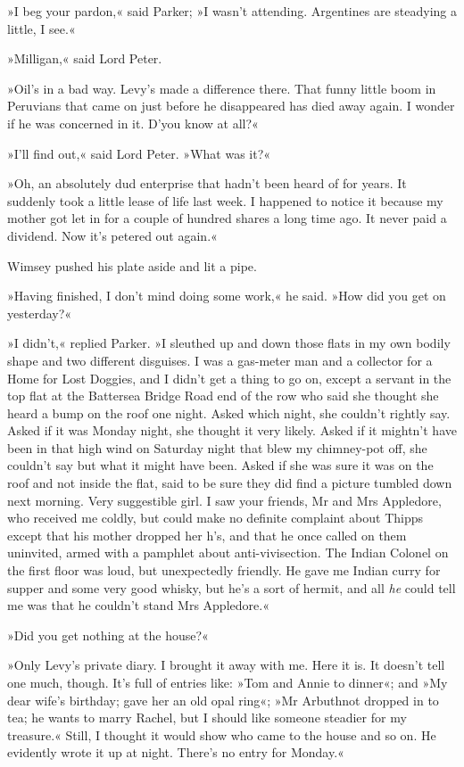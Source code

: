 »I beg your pardon,« said Parker; »I wasn't attending. Argentines are steadying a little, I see.«

»Milligan,« said Lord Peter.

»Oil's in a bad way. Levy's made a difference there. That funny little boom in Peruvians that came on just before he disappeared has died away again. I wonder if he was concerned in it. D'you know at all?«

»I'll find out,« said Lord Peter. »What was it?«

»Oh, an absolutely dud enterprise that hadn't been heard of for years. It suddenly took a little lease of life last week. I happened to notice it because my mother got let in for a couple of hundred shares a long time ago. It never paid a dividend. Now it's petered out again.«

Wimsey pushed his plate aside and lit a pipe.

»Having finished, I don't mind doing some work,« he said. »How did you get on yesterday?«

»I didn't,« replied Parker. »I sleuthed up and down those flats in my own bodily shape and two different disguises. I was a gas-meter man and a collector for a Home for Lost Doggies, and I didn't get a thing to go on, except a servant in the top flat at the Battersea Bridge Road end of the row who said she thought she heard a bump on the roof one night. Asked which night, she couldn't rightly say. Asked if it was Monday night, she thought it very likely. Asked if it mightn't have been in that high wind on Saturday night that blew my chimney-pot off, she couldn't say but what it might have been. Asked if she was sure it was on the roof and not inside the flat, said to be sure they did find a picture tumbled down next morning. Very suggestible girl. I saw your friends, Mr and Mrs Appledore, who received me coldly, but could make no definite complaint about Thipps except that his mother dropped her h's, and that he once called on them uninvited, armed with a pamphlet about anti-vivisection. The Indian Colonel on the first floor was loud, but unexpectedly friendly. He gave me Indian curry for supper and some very good whisky, but he's a sort of hermit, and all \textit{he} could tell me was that he couldn't stand Mrs Appledore.«

»Did you get nothing at the house?«

»Only Levy's private diary. I brought it away with me. Here it is. It doesn't tell one much, though. It's full of entries like: »Tom and Annie to dinner«; and »My dear wife's birthday; gave her an old opal ring«; »Mr Arbuthnot dropped in to tea; he wants to marry Rachel, but I should like someone steadier for my treasure.« Still, I thought it would show who came to the house and so on. He evidently wrote it up at night. There's no entry for Monday.«

